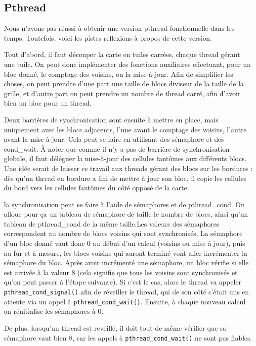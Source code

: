 \subsection{Pthread}

Nous n'avons pas réussi à obtenir une version pthread fonctionnelle dans les temps. Toutefois, voici les pistes reflexions à propos de cette version.

Tout d'abord, il faut découper la carte en tuiles carrées, chaque thread gérant une tuile. On peut donc implémenter des fonctions auxiliaires effectuant, pour un bloc donné, le comptage des voisins, ou la mise-à-jour. Afin de simplifier les choses, on peut prendre d'une part une taille de blocs diviseur de la taille de la grille, et d'autre part on peut prendre un nombre de thread carré, afin d'avoir bien un bloc pour un thread.

Deux barrières de synchronisation sont ensuite à mettre en place, mais uniquement avec les blocs adjacents, l'une avant le comptage des voisins, l'autre avant la mise à jour. Cela peut se faire en utilisant des sémaphore et des cond\_wait. À noter que comme il n'y a pas de barrière de synchronisation globale, il faut déléguer la mise-à-jour des cellules fantômes aux différents blocs. Une idée serait de laisser ce travail aux threads gérant des blocs sur les bordures : dès qu'un thread en bordure a fini de mettre à jour son bloc, il copie les cellules du bord vers les cellules fantômes du côté opposé de la carte.

la synchronisation peut se faire à l'aide de sémaphores et de pthread\_cond. On alloue pour ça un tableau de sémaphore de taille le nombre de blocs, ainsi qu'un tableau de pthread\_cond de la même taille.Les valeurs des sémaphores correspondent au nombre de blocs voisins qui sont synchronisés. La sémaphore d'un bloc donné vaut donc 0 au début d'un calcul (voisins ou mise à jour), puis au fur et à mesure, les blocs voisins qui auront terminé vont aller incrémenter la sémaphore du bloc. Après avoir incrémenté une sémaphore, un bloc vérifie si elle est arrivée à la valeur 8 (cela signifie que tous les voisins sont synchronisés et qu'on peut passer à l'étape suivante). Si c'est le cas, alors le thread va appeler \texttt{pthread\_cond\_signal()} afin de réveiller le thread, qui de son côté s'était mis en attente via un appel à \texttt{pthread\_cond\_wait()}. Ensuite, à chaque nouveau calcul on rénitialise les sémaphores à 0.

De plus, lorsqu'un thread est reveillé, il doit tout de même vérifier que sa sémaphore vaut bien 8, car les appels à \texttt{pthread\_cond\_wait()} ne sont pas fiables.

